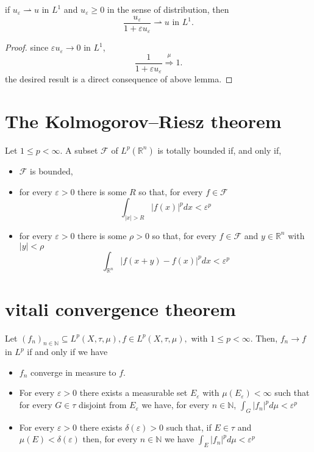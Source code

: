 \begin{example}
if $u_\varepsilon\rightharpoonup u$ in $L^1$ and $u_\varepsilon\geqslant0$ in the sense of distribution, then $$\frac{u_\varepsilon}{1 + \varepsilon u_\varepsilon}\rightharpoonup u \text{ in } L^1.$$
\begin{proof}
since $\varepsilon u_\varepsilon\rightarrow 0$ in $L^1$, $$\frac{1}{1 + \varepsilon u_\varepsilon}\stackrel{\mu}{\Longrightarrow}1.$$
the desired result is a direct consequence of above lemma.
\end{proof}
\end{example}

\section{The Kolmogorov–Riesz theorem}
\begin{theorem}
	 Let $1 \leq p<\infty .$ A subset $\mathcal{F}$ of $L^{p}\left(\mathbb{R}^{n}\right)$ is totally bounded if, and only if,
	 \begin{itemize}
	 	\item $\mathcal{F}$ is bounded,
	 	\item for every $\varepsilon>0$ there is some $R$ so that, for every $f \in \mathcal{F}$
	 	$$
	 	\int_{|x|>R}|f(x)|^{p} d x<\varepsilon^{p}
	 	$$
	 	\item for every $\varepsilon>0$ there is some $\rho>0$ so that, for every $f \in \mathcal{F}$ and $y \in \mathbb{R}^{n}$ with $|y|<\rho$
	 	$$
	 	\int_{\mathbb{R}^{n}}|f(x+y)-f(x)|^{p} d x<\varepsilon^{p}
	 	$$	
	 \end{itemize}
\end{theorem}
\section{vitali convergence theorem}

\begin{theorem}
Let $\left(f_{n}\right)_{n \in \mathbb{N}} \subseteq L^{p}(X, \tau, \mu), f \in L^{p}(X, \tau, \mu),$ with $1 \leq p<\infty .$ Then, $f_{n} \rightarrow f$ in $L^{p}$ if and only if we have
\begin{itemize}
	\item $f_{n}$ converge in measure to $f$.
	\item For every $\varepsilon>0$ there exists a measurable set $E_{\varepsilon}$ with $\mu\left(E_{\varepsilon}\right)<\infty$ such that for every $G \in \tau$ disjoint from $E_{\varepsilon}$ we have, for every $n \in \mathbb{N}$, $\int_{G}\left|f_{n}\right|^{p} d \mu<\varepsilon^{p}$
	\item  For every $\varepsilon>0$ there exists $\delta(\varepsilon)>0$ such that, if $E \in \tau$ and $\mu(E)<\delta(\varepsilon)$ then, for every $n \in \mathbb{N}$ we have $\int_{E}\left|f_{n}\right|^{p} d \mu<\varepsilon^{p}$	
\end{itemize}
\end{theorem}

